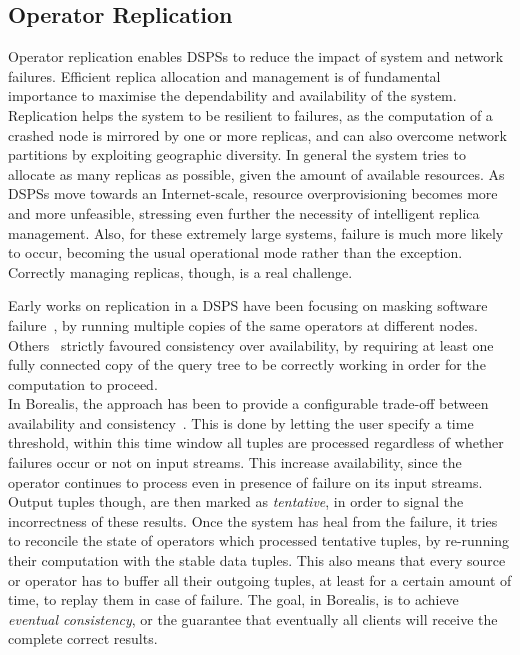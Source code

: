 \subsection{Operator Replication}
Operator replication enables DSPSs to reduce the impact of system and network failures. Efficient replica allocation and
management is of fundamental importance to maximise the dependability and availability of the system. Replication helps
the system to be resilient to failures, as the computation of a crashed node is mirrored by one or more replicas, and can also
overcome network partitions by exploiting geographic diversity. In general the system tries to allocate as many
replicas as possible, given the amount of available resources.  As DSPSs move towards an Internet-scale, resource
overprovisioning becomes more and more unfeasible, stressing even further the necessity of intelligent replica management.
Also, for these extremely large systems, failure is much more likely to occur, becoming the usual operational mode
rather than the exception. Correctly managing replicas, though, is a real challenge.

Early works on replication in a DSPS have been focusing on masking software failure~\cite{borealis_ha_algos}, by running multiple copies
of the same operators at different nodes. Others~\cite{ha_ft_dataflows} strictly favoured consistency over availability, by requiring at least
one fully connected copy of the query tree to be correctly working in order for the computation to proceed. \\
In Borealis, the approach has been to provide a configurable trade-off between availability and
consistency~\cite{borealis-fault_tolerance}.
This is done by letting the user specify a time threshold, within this time window all tuples are processed regardless
of whether failures occur or not on input streams. This increase availability, since the operator continues to process
even in presence of failure on its input streams. Output tuples though, are then marked as \textit{tentative}, in order
to signal the incorrectness of these results. Once the system has heal from the failure, it tries to reconcile the
state of operators which processed tentative tuples, by re-running their computation with the stable data tuples. This
also means that every source or operator has to buffer all their outgoing tuples, at least for a certain amount of time,
to replay them in case of failure. The goal, in Borealis, is to achieve \textit{eventual consistency}, or the guarantee
that eventually all clients will receive the complete correct results. 

